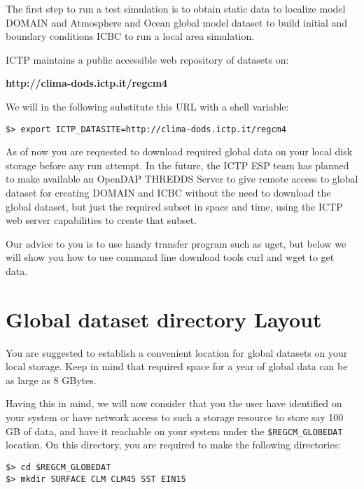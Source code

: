 %
%

The first step to run a test simulation is to obtain static data to localize
model DOMAIN and Atmosphere and Ocean global model dataset to build initial
and boundary conditions ICBC to run a local area simulation.

ICTP maintains a public accessible web repository of datasets on:

{\bf http://clima-dods.ictp.it/regcm4 }

We will in the following substitute this URL with a shell variable:

\begin{Verbatim}
$> export ICTP_DATASITE=http://clima-dods.ictp.it/regcm4
\end{Verbatim}

As of now you are requested to download required global data on your local disk
storage before any run attempt. In the future, the ICTP ESP team has
planned to make available an OpenDAP THREDDS Server to give remote access
to global dataset for creating DOMAIN and ICBC without the need to
download the global dataset, but just the required subset in space and time,
using the ICTP web server capabilities to create that subset.

Our advice to you is to use handy transfer program such as uget, but below
we will show you how to use command line download tools curl and
wget to get data.

\section{Global dataset directory Layout}

You are suggested to establish a convenient location for global datasets
on your local storage. Keep in mind that required space for a year of global
data can be as large as 8 GBytes.

Having this in mind, we will now consider that you the user have identified
on your system or have network access to such a storage resource to store say
100 GB of data, and have it reachable on your system under the
\verb=$REGCM_GLOBEDAT= location.
On this directory, you are required to make the following directories:

\begin{Verbatim}
$> cd $REGCM_GLOBEDAT
$> mkdir SURFACE CLM CLM45 SST EIN15
\end{Verbatim}

